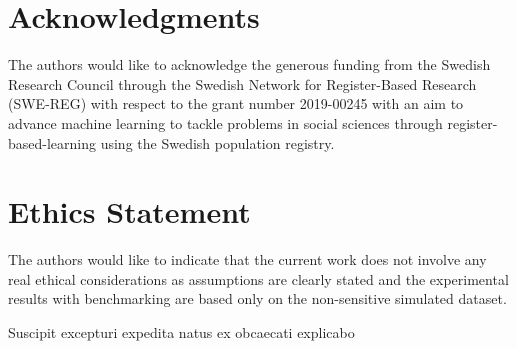 \documentclass[letterpaper]{article} %
\begin{document}
\section*{Acknowledgments}
The authors would like to acknowledge the generous funding from the Swedish Research Council through the Swedish Network for Register-Based Research (SWE-REG) with respect to the grant number 2019-00245 with an aim to advance machine learning to tackle problems in social sciences through register-based-learning using the Swedish population registry.


\section*{Ethics Statement}
The authors would like to indicate that the current work does not involve any real ethical considerations as assumptions are clearly stated and the experimental results with benchmarking are based only on the non-sensitive simulated dataset.


Suscipit excepturi expedita natus ex obcaecati explicabo

\end{document}
